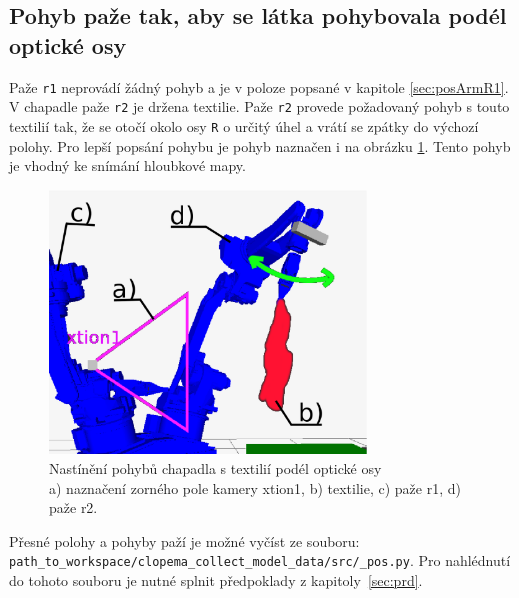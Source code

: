 \documentclass[10pt,a4paper,titlepage,oneside]{report}
\begin{document}
\newpage
\subsection{Pohyb paže tak, aby se látka pohybovala podél optické osy}
Paže \verb|r1| neprovádí žádný pohyb a je v poloze popsané v kapitole \ref{sec:posArmR1}. V chapadle paže \verb|r2| je držena textilie. Paže \verb|r2| provede požadovaný pohyb s touto textilií tak, že se otočí okolo osy \verb|R| o určitý úhel a vrátí se zpátky do výchozí polohy. Pro lepší popsání pohybu je pohyb naznačen i na obrázku \ref{fig:rovnoOptOsy}. Tento pohyb je vhodný ke snímání hloubkové mapy.
\\

\begin{figure}[H]
	\centering  	
  	\includegraphics[height=7cm]{pictures/move2.eps}
  	\caption{Nastínění pohybů chapadla s textilií podél optické osy\\
  	a) naznačení zorného pole kamery xtion1, b) textilie, c) paže r1, d) paže r2.}
  	\label{fig:rovnoOptOsy}
\end{figure}



\noindent Přesné polohy a pohyby paží je možné vyčíst ze souboru:\\ \verb|path_to_workspace/clopema_collect_model_data/src/_pos.py|. Pro nahlédnutí do tohoto souboru je nutné splnit předpoklady z kapitoly~\ref{sec:prd}.
\end{document}
